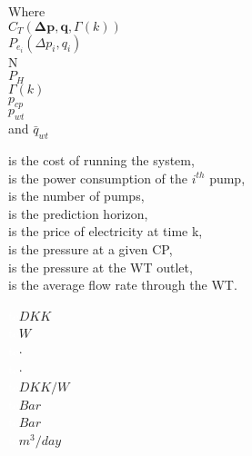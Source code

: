  \begin{minipage}[t]{0.24\textwidth}
 Where\\
 \hspace*{8mm} $C_T(\pmb{\Delta{p}},\pmb{q},\Gamma(k))$ \\
 \hspace*{8mm} $P_{e_{i}}(\Delta{p}_i,q_i)$ \\
 \hspace*{8mm} N \\
 \hspace*{8mm} $P_H$ \\
 \hspace*{8mm} $\Gamma(k)$ \\
 \hspace*{8mm} $p_{cp}$ \\
 \hspace*{8mm} $p_{wt}$ \\
  and \hspace*{0.7mm} $\bar{q}_{wt}$	
 \end{minipage}
 \begin{minipage}[t]{0.63\textwidth}
 \vspace*{2mm}
 is the cost of running the system, \\
 is the power consumption of the $i^{th}$ pump,\\
 is the number of pumps,\\
 is the prediction horizon,\\
 is the price of electricity at time k,\\ 
 is the pressure at a given CP,\\ %
 is the pressure at the WT outlet,\\ %
 is the average flow rate through the WT. %
 \end{minipage}
 \begin{minipage}[t]{0.10\textwidth}
 \vspace*{2mm}
 \textcolor{White}{te}$\unit{DKK}$\\
 \textcolor{White}{te}$\unit{W}$\\
 \textcolor{White}{te}$\unit{\cdot}$\\
 \textcolor{White}{te}$\unit{\cdot}$\\
 \textcolor{White}{te}$\unit{{DKK}/{W}}$\\
 \textcolor{White}{te}$\unit{Bar}$\\
 \textcolor{White}{te}$\unit{Bar}$\\
  \textcolor{White}{te}$\unit{{m^3}/{day}}$
 \end{minipage}

